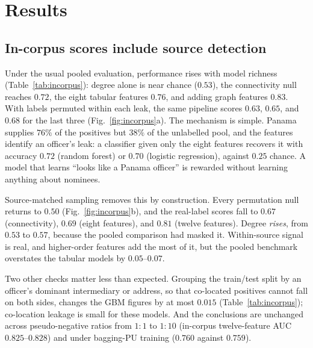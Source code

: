 \documentclass[11pt]{article}
\begin{document}
\section{Results}\label{sec:results}

\subsection{In-corpus scores include source detection}\label{sec:res-incorpus}
Under the usual pooled evaluation, performance rises with model richness
(Table~\ref{tab:incorpus}): degree alone is near chance ($0.53$), the connectivity
null reaches $0.72$, the eight tabular features $0.76$, and adding graph features
$0.83$. With labels permuted within each leak, the same pipeline scores $0.63$,
$0.65$, and $0.68$ for the last three (Fig.~\ref{fig:incorpus}a). The mechanism is
simple. Panama supplies $76\%$ of the positives but $38\%$ of the unlabelled pool,
and the features identify an officer's leak: a classifier given only the eight
features recovers it with accuracy $0.72$ (random forest) or $0.70$ (logistic
regression), against $0.25$ chance. A model that learns ``looks like a Panama
officer'' is rewarded without learning anything about nominees.

Source-matched sampling removes this by construction. Every permutation null
returns to $0.50$ (Fig.~\ref{fig:incorpus}b), and the real-label scores fall to
$0.67$ (connectivity), $0.69$ (eight features), and $0.81$ (twelve features). Degree
\emph{rises}, from $0.53$ to $0.57$, because the pooled comparison had masked it.
Within-source signal is real, and higher-order features add the most of it, but
the pooled benchmark overstates the tabular models by $0.05$--$0.07$.

Two other checks matter less than expected. Grouping the train/test split by an
officer's dominant intermediary or address, so that co-located positives cannot
fall on both sides, changes the GBM figures by at most $0.015$
(Table~\ref{tab:incorpus}); co-location leakage is small for these models. And the
conclusions are unchanged across pseudo-negative ratios from $1{:}1$ to $1{:}10$
(in-corpus twelve-feature AUC $0.825$--$0.828$) and under bagging-PU training
\citep{mordelet2014bagging} ($0.760$ against $0.759$).
\end{document}
